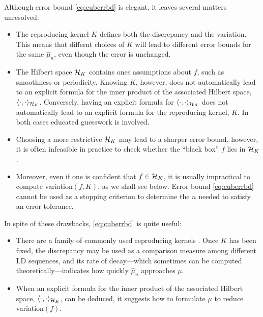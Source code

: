 \documentclass{svproc}
\begin{document}
Although error bound \eqref{eq:cuberrbd} is elegant, it leaves several matters unresolved:
\begin{itemize}
	\item The reproducing kernel $K$ defines both the discrepancy and the variation.  This means that differnt choices of $K$ will lead to different error bounds for the same $\hat{\mu}_n$, even though the error is unchanged.
	\item The Hilbert space ${\mathcal{H}}_K$ contains ones assumptions about $f$, such as smoothness or periodicity. Knowing $K$, however, does not automatically lead to an explicit formula for the inner product of the associated Hilbert space, $\langle \cdot, \cdot \rangle_{{\mathcal{H}}_K}$.  Conversely, having an explicit formula for  $\langle \cdot, \cdot \rangle_{{\mathcal{H}}_K}$ does not automatically lead to an explicit formula for the reproducing kernel, $K$.  In both cases educated guesswork is involved.
	\item Choosing a more restrictive ${\mathcal{H}}_K$ may lead to a sharper error bound, however, it is often infeasible in practice to check whether the ``black box'' $f$ lies in ${\mathcal{H}}_K$.
	\item   Moreover, even if one is confident that $f \in {\mathcal{H}}_K$, it is usually impractical to compute variation$(f,K)$, as we shall see below.  Error bound \eqref{eq:cuberrbd} cannot be used as a stopping criterion to determine the $n$ needed to satisfy an error tolerance.
\end{itemize}
In spite of these drawbacks, \eqref{eq:cuberrbd} is quite useful:
\begin{itemize}
	\item There are a family of commonly used reproducing kernels \cite{BerT-A04,Hic97a,Hic98b,Hic99b}. Once $K$ has been fixed, the discrepancy may be used as a comparison measure among different LD sequences, and its rate of decay---which sometimes can be computed theoretically---indicates how quickly $\hat{\mu}_n$ approaches $\mu$.
	\item When an explicit formula for the inner product of the associated Hilbert space, $\langle \cdot, \cdot \rangle_{{\mathcal{H}}_K}$, can be deduced, it suggests how to formulate $\mu$ to reduce variation$(f)$.
\end{itemize}
\end{document}
